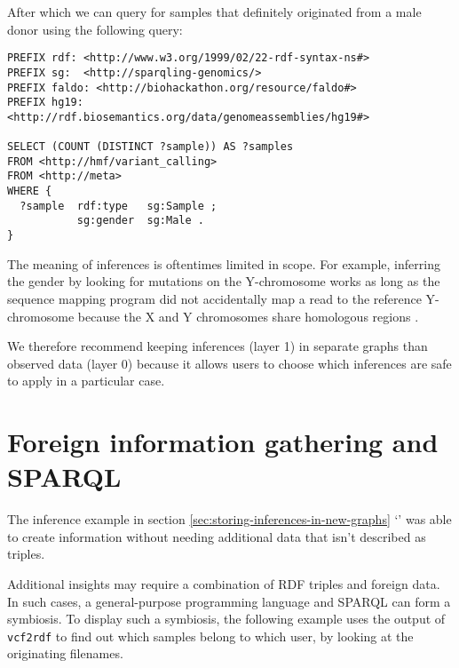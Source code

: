   After which we can query for samples that definitely originated from a male
  donor using the following query:

\begin{siderules}
\begin{verbatim}
PREFIX rdf: <http://www.w3.org/1999/02/22-rdf-syntax-ns#>
PREFIX sg:  <http://sparqling-genomics/>
PREFIX faldo: <http://biohackathon.org/resource/faldo#>
PREFIX hg19:  <http://rdf.biosemantics.org/data/genomeassemblies/hg19#>

SELECT (COUNT (DISTINCT ?sample)) AS ?samples
FROM <http://hmf/variant_calling>
FROM <http://meta>
WHERE {
  ?sample  rdf:type   sg:Sample ;
           sg:gender  sg:Male .
}
\end{verbatim}
\end{siderules}

  The meaning of inferences is oftentimes limited in scope.  For example,
  inferring the gender by looking for mutations on the Y-chromosome works
  as long as the sequence mapping program did not accidentally map a read
  to the reference Y-chromosome because the X and Y chromosomes share
  homologous regions \citep{El-Mogharbel2008}.

  We therefore recommend keeping inferences (layer 1) in separate graphs
  than observed data (layer 0) because it allows users to choose which
  inferences are safe to apply in a particular case.


\section{Foreign information gathering and SPARQL}

  The inference example in section \ref{sec:storing-inferences-in-new-graphs}
  {\color{LinkGray}`'} was able
  to create information without needing additional data that isn't described
  as triples.

  Additional insights may require a combination of RDF triples and foreign
  data.  In such cases, a general-purpose programming language and SPARQL can
  form a symbiosis.  To display such a symbiosis, the following example uses
  the output of \texttt{vcf2rdf} to find out which samples belong to which
  user, by looking at the originating filenames.

